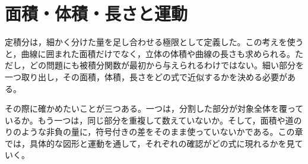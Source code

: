 \chapter{面積・体積・長さと運動}\label{章:積分の応用}

定積分は，細かく分けた量を足し合わせる極限として定義した。この考えを使うと，曲線に囲まれた面積だけでなく，立体の体積や曲線の長さも求められる。ただし，どの問題にも被積分関数が最初から与えられるわけではない。細い部分を一つ取り出し，その面積，体積，長さをどの式で近似するかを決める必要がある。

その際に確かめたいことが三つある。一つは，分割した部分が対象全体を覆っているか。もう一つは，同じ部分を重複して数えていないか。そして，面積や道のりのような非負の量に，符号付きの差をそのまま使っていないかである。この章では，具体的な図形と運動を通して，それぞれの確認がどの式に現れるかを見ていく。

%
%
%
%
%
%
%
%
%
